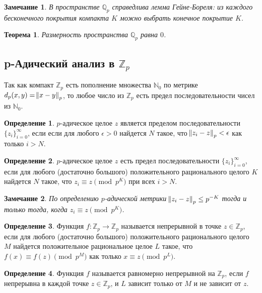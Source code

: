 \documentclass[master, och, diploma, times]{sty/SCWorks}
\theoremstyle{plain}
\newtheorem{thethm}{Теорема}[section]
\newtheorem{note}{Замечание}[section]
\theoremstyle{definition}
\newtheorem{defn}{Определение}[section]
\numberwithin{equation}{section}
\begin{document}
\begin{note}
В пространстве $\mathbb {Q}_p$ справедлива лемма Гейне-Бореля: из каждого бесконечного покрытия компакта $K$ можно выбрать конечное покрытие $K$.
\end{note}

\begin{thethm}
Размерность пространства $\mathbb {Q}_p$ равна $0$.
\end{thethm}

\subsection{p-Адический анализ в $\mathbb {Z}_p$}

Так как компакт $\mathbb {Z}_p$ есть пополнение множества $\mathbb {N}_0$ по метрике \linebreak ${d_p(x,y)=\norm{x-y}_p}$, то любое число из $\mathbb {Z}_p$ есть предел последовательности чисел из $\mathbb {N}_0$.

\begin{defn}
$p$-адическое целое $z$ является пределом последовательности $\{z_i\}^{\infty}_{i=0}$, если если для любого $\epsilon > 0$ найдется $N$ такое, что $\norm{z_i-z}_p < \epsilon$ как только $i>N$. \cite{bib:dynamic:anashin}
\end{defn}

\begin{defn}
$p$-адическое целое $z$ есть предел последовательности $\{z_i\}^{\infty}_{i=0}$, если для любого (достаточно большого) положительного рационального целого $K$ найдется $N$ такое, что ${z_i \equiv z \pmod p^K}$ при всех $i>N$. \cite{bib:analysis:anashin}
\end{defn}

\begin{note}
По определению $p$-адической метрики $\norm{z_i-z}_p \le p^{-K}$ тогда и только тогда, когда $z_i \equiv z \pmod p^K$. \cite{bib:analisys:khrennikov}
\end{note}

\begin{defn}
Функция $f:\mathbb {Z}_p \rightarrow \mathbb {Z}_p$ называется непрерывной в точке $z \in \mathbb {Z}_p$, если для любого (достаточно большого) положительного рационального целого $M$ найдется положительное рациональное целое $L$ такое, что ${f(x) \equiv f(z) \pmod p^M}$ как только $x \equiv z \pmod{p^L}$. \cite{bib:analysis:anashin}
\end{defn}

\begin{defn}
Функция $f$ называется равномерно непрерывной на $\mathbb {Z}_p$, если $f$ непрерывна в каждой точке $z \in \mathbb {Z}_p$, и $L$ зависит только от $M$ и не зависит от $z$.\cite{bib:analysis:ciocan}
\end{defn}
\end{document}
